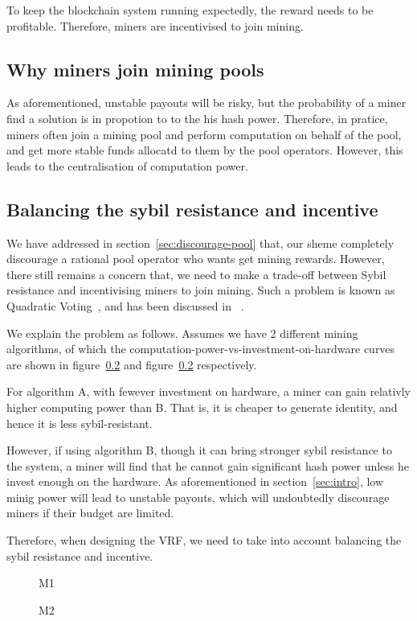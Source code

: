 To keep the blockchain system running expectedly, the reward needs to be profitable.
Therefore, miners are incentivised to join mining.

\subsection{Why miners join mining pools}

As aforementioned, unstable payouts will be risky, but the probability of a miner find a solution is in propotion to to the his hash power.
Therefore, in pratice, miners often join a mining pool and perform computation on behalf of the pool, and get more stable funds allocatd to them by the pool operators.
However, this leads to the centralisation of computation power.

\subsection{Balancing the sybil resistance and incentive}

We have addressed in section~\ref{sec:discourage-pool} that, our sheme completely discourage a rational pool operator who wants get mining rewards.
However, there still remains a concern that, we need to make a trade-off between Sybil resistance and incentivising miners to join mining.
Such a problem is known as Quadratic Voting~\cite{lalley2018quadratic}, and has been discussed in ~\cite{radical}.

We explain the problem as follows. Assumes we have 2 different mining algorithms, of which the computation-power-vs-investment-on-hardware curves are shown in figure~\ref{} and figure~\ref{} respectively.

For algorithm A, with fewever investment on hardware, a miner can gain relativly higher computing power than B. That is, it is cheaper to generate identity, and hence it is less sybil-resistant.

However, if using algorithm B, though it can bring stronger sybil resistance to the system, a miner will find that he cannot gain significant hash power unless he invest enough on the hardware.
As aforementioned in section~\ref{sec:intro}, low minig power will lead to unstable payouts, which will undoubtedly discourage miners if their budget are limited.

Therefore, when designing the VRF, we need to take into account balancing the sybil resistance and incentive.

\begin{figure}
\centering
{}
\caption{M1} \label{fig:M1}
\end{figure}


\begin{figure}
\centering
{}
\caption{M2} \label{fig:M2}
\end{figure}

